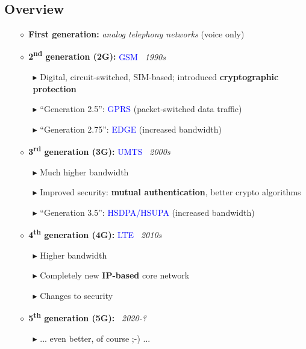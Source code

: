 \subsection{Overview}
\begin{itemize}
    \item[\(\diamond\)] \textbf{First generation:} \emph{analog telephony networks} (voice only)
    \item[\(\diamond\)] \textbf{2\textsuperscript{nd} generation (2G):} \textcolor{blue}{GSM} \textit{~1990s}
    \begin{itemize}
        \item[\(\blacktriangleright\)] Digital, circuit-switched, SIM-based; introduced \textbf{cryptographic protection}
        \item[\(\blacktriangleright\)] “Generation 2.5”: \textcolor{blue}{GPRS} (packet-switched data traffic)
        \item[\(\blacktriangleright\)] “Generation 2.75”: \textcolor{blue}{EDGE} (increased bandwidth)
    \end{itemize}
    \item[\(\diamond\)] \textbf{3\textsuperscript{rd} generation (3G):} \textcolor{blue}{UMTS} \textit{~2000s}
    \begin{itemize}
        \item[\(\blacktriangleright\)] Much higher bandwidth
        \item[\(\blacktriangleright\)] Improved security: \textbf{mutual authentication}, better crypto algorithms
        \item[\(\blacktriangleright\)] “Generation 3.5”: \textcolor{blue}{HSDPA/HSUPA} (increased bandwidth)
    \end{itemize}
    \item[\(\diamond\)] \textbf{4\textsuperscript{th} generation (4G):} \textcolor{blue}{LTE} \textit{~2010s}
    \begin{itemize}
        \item[\(\blacktriangleright\)] Higher bandwidth
        \item[\(\blacktriangleright\)] Completely new \textbf{IP-based} core network
        \item[\(\blacktriangleright\)] Changes to security
    \end{itemize}
    \item[\(\diamond\)] \textbf{5\textsuperscript{th} generation (5G):} \textit{~2020-?}
    \begin{itemize}
        \item[\(\blacktriangleright\)] ... even better, of course ;-) ...
    \end{itemize}
\end{itemize}

